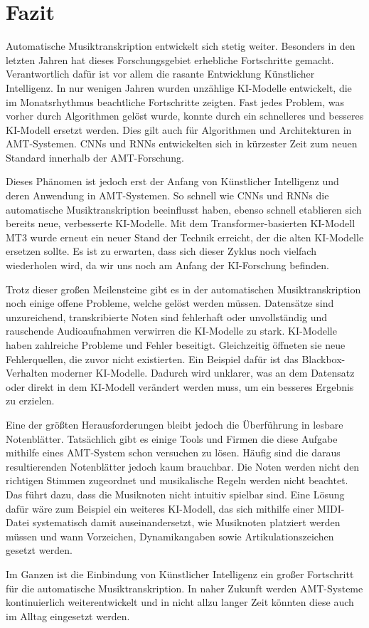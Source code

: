 \section{Fazit}
Automatische Musiktranskription entwickelt sich stetig weiter.
Besonders in den letzten Jahren hat dieses Forschungsgebiet erhebliche Fortschritte gemacht.
Verantwortlich dafür ist vor allem die rasante Entwicklung Künstlicher Intelligenz.
In nur wenigen Jahren wurden unzählige KI-Modelle entwickelt, die im Monatsrhythmus beachtliche Fortschritte zeigten.
Fast jedes Problem, was vorher durch Algorithmen gelöst wurde,
konnte durch ein schnelleres und besseres KI-Modell ersetzt werden.
Dies gilt auch für Algorithmen und Architekturen in AMT-Systemen.
CNNs und RNNs entwickelten sich in kürzester Zeit zum neuen Standard innerhalb der AMT-Forschung.

Dieses Phänomen ist jedoch erst der Anfang von Künstlicher Intelligenz und deren Anwendung in AMT-Systemen.
So schnell wie CNNs und RNNs die automatische Musiktranskription beeinflusst haben,
ebenso schnell etablieren sich bereits neue, verbesserte KI-Modelle.
Mit dem Transformer-basierten KI-Modell MT3 wurde erneut ein neuer Stand der Technik erreicht,
der die alten KI-Modelle ersetzen sollte.
Es ist zu erwarten, dass sich dieser Zyklus noch vielfach wiederholen wird,
da wir uns noch am Anfang der KI-Forschung befinden.

Trotz dieser großen Meilensteine gibt es in der automatischen Musiktranskription noch einige offene Probleme,
welche gelöst werden müssen.
Datensätze sind unzureichend, transkribierte Noten sind fehlerhaft oder unvollständig
und rauschende Audioaufnahmen verwirren die KI-Modelle zu stark.
KI-Modelle haben zahlreiche Probleme und Fehler beseitigt.
Gleichzeitig öffneten sie neue Fehlerquellen, die zuvor nicht existierten.
Ein Beispiel dafür ist das Blackbox-Verhalten moderner KI-Modelle.
Dadurch wird unklarer, was an dem Datensatz oder direkt in dem KI-Modell verändert werden muss,
um ein besseres Ergebnis zu erzielen.

Eine der größten Herausforderungen bleibt jedoch die Überführung in lesbare Notenblätter.
Tatsächlich gibt es einige Tools und Firmen die diese Aufgabe mithilfe eines AMT-System schon versuchen zu lösen.
Häufig sind die daraus resultierenden Notenblätter jedoch kaum brauchbar.
Die Noten werden nicht den richtigen Stimmen zugeordnet und musikalische Regeln werden nicht beachtet.
Das führt dazu, dass die Musiknoten nicht intuitiv spielbar sind.
Eine Lösung dafür wäre zum Beispiel ein weiteres KI-Modell,
das sich mithilfe einer MIDI-Datei systematisch damit auseinandersetzt,
wie Musiknoten platziert werden müssen und wann Vorzeichen, Dynamikangaben sowie Artikulationszeichen gesetzt werden.

Im Ganzen ist die Einbindung von Künstlicher Intelligenz ein großer Fortschritt für die automatische Musiktranskription.
In naher Zukunft werden AMT-Systeme kontinuierlich weiterentwickelt
und in nicht allzu langer Zeit könnten diese auch im Alltag eingesetzt werden.
